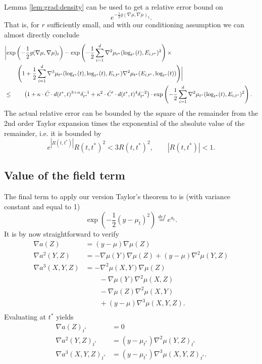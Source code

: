 \documentclass{article}
\begin{document}
Lemma \ref{lem:grad:density} can be used to get a relative error bound on
$$
e^{-\frac{1}{2}g(\nabla \mu, \nabla \mu)_t}.
$$
That is, for $r$ sufficiently small, and with our conditioning assumption we can almost directly conclude 
\begin{equation}
\begin{aligned}
\lefteqn{  \biggl|\exp\left(-\frac{1}{2}g(\nabla \mu, \nabla \mu)_t\right) - \exp\left(-\frac{1}{2} \sum_{i=1}^d \nabla^2 \mu_{t^*}(\log_{t^*}(t), E_{i,t^*})^2\right) \times} \\
& \qquad   \left(1 + \frac{1}{2} \sum_{i=1}^d \nabla^3 \mu_{t^*}(\log_{t^*}(t), \log_{t^*}(t), E_{i,t^*}) \nabla^2 \mu_{t^*}(E_{i,t^*}, \log_{t^*}(t)) \right) \biggr|  \\
&  \leq \qquad \left(1 + \kappa \cdot \bar{C} \cdot d(t^*,t)^{3+\alpha} \delta_{t^*}^{-1} + \kappa^2 \cdot \bar{C}' \cdot d(t^*,t)^4 \delta_{t^*}^{-2}\right) \cdot \exp\left(-\frac{1}{2} \sum_{i=1}^d \nabla^2 \mu_{t^*}(\log_{t^*}(t), E_{i,t^*})^2\right) .
\end{aligned}
\end{equation}
The actual relative error can be bounded by the square of the  remainder from the 2nd order Taylor expansion
times the exponential of the absolute value of the remainder, i.e. it is bounded by
$$
e^{|R(t,t^*)|} R(t,t^*)^2 < 3 R(t,t^*)^2, \qquad |R(t,t^*)|<1.
$$

\subsection{Value of the field term}

The final term to apply our version Taylor's theorem to is (with variance constant and equal to 1)
$$
\exp\left(-\frac{1}{2}(y-\mu_t)^2\right) \overset{def}{=} e^{a_t}.
$$
It is by now straightforward to verify
$$
\begin{aligned}
\nabla a(Z) &= (y-\mu) \nabla \mu(Z)\\
\nabla a^2(Y, Z) &= -\nabla \mu(Y) \nabla \mu(Z) + (y-\mu) \nabla^2 \mu(Y, Z)\\
\nabla a^3(X, Y, Z) &= -\nabla^2 \mu(X, Y) \nabla \mu(Z)\\
& \qquad -\nabla \mu(Y) \nabla^2 \mu(X, Z) \\
& \qquad -\nabla \mu(Z) \nabla^2 \mu(X, Y) \\
& \qquad + (y - \mu) \nabla^3 \mu(X, Y, Z). \\
\end{aligned}
$$
Evaluating at $t^*$ yields
$$
\begin{aligned}
\nabla a(Z)_{t^*} &= 0 \\
\nabla a^2(Y, Z)_{t^*} &=  (y-\mu_{t^*}) \nabla^2 \mu(Y, Z)_{t^*}\\
\nabla a^3(X, Y, Z)_{t^*} &=   (y - \mu_{t^*}) \nabla^3 \mu(X, Y, Z)_{t^*}. \\
\end{aligned}
$$
\end{document}
